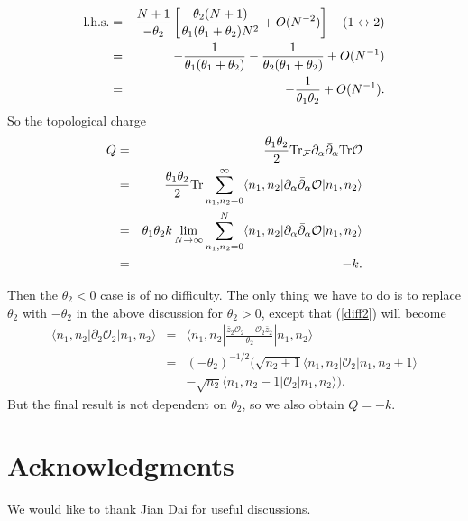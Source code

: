 \documentclass[a4paper,a4paper]{article}
\begin{document}
\begin{eqnarray}
\textrm{l.h.s.} &=&\frac{N+1}{-\theta _{2}}\left[ \frac{\theta _{2}(N+1)}{%
\theta _{1}(\theta _{1}+\theta _{2})N^{2}}+O(N^{-2})\right]
+(1\leftrightarrow 2)  \nonumber \\
&=&-\frac{1}{\theta _{1}(\theta _{1}+\theta _{2})}-\frac{1}{\theta
_{2}(\theta _{1}+\theta _{2})}+O(N^{-1})  \nonumber \\
&=&-\frac{1}{\theta _{1}\theta _{2}}+O(N^{-1}).
\end{eqnarray}%
So the topological charge%
\begin{eqnarray}
Q &=&\frac{\theta _{1}\theta _{2}}{2}\mathrm{Tr}_\mathcal{F}\partial _{\alpha }\bar{%
\partial}_{\alpha }\mathrm{Tr}\mathcal{O}  \nonumber \\
&=&\frac{\theta _{1}\theta _{2}}{2}\mathrm{Tr}\sum_{n_{1},n_{2}=0}^{\infty
}\langle n_{1},n_{2}|\partial _{\alpha }\bar{\partial}_{\alpha }\mathcal{O}%
|n_{1},n_{2}\rangle  \nonumber \\
&=&\theta _{1}\theta _{2}k\lim_{N\rightarrow \infty
}\sum_{n_{1},n_{2}=0}^{N}\langle n_{1},n_{2}|\partial _{\alpha }\bar{\partial%
}_{\alpha }\mathcal{O}|n_{1},n_{2}\rangle  \nonumber \\
&=&-k.
\end{eqnarray}

Then the $\theta _{2}<0$ case is of no difficulty. The only thing
we have to do is to replace $\theta _{2}$ with $-\theta _{2}$ in
the above discussion for $\theta _{2}>0$, except that
(\ref{diff2}) will become
\begin{eqnarray} \langle n_{1},n_{2}|\partial_{2}\mathcal{O}_{2}|n_{1},n_{2}\rangle
&=&\langle n_{1},n_{2}|\frac{\bar{z}_{2}\mathcal{O}_{2}-\mathcal{O}_{2}\bar{z}_{2}}{\theta_{2}}|n_{1},n_{2}\rangle \nonumber\\
&=&(-\theta_2)^{-1/2}(\sqrt{n_2+1}\langle
n_{1},n_{2}|\mathcal{O}_2|n_{1},n_{2}+1\rangle\\
&&-\sqrt{n_2}\langle
n_{1},n_{2}-1|\mathcal{O}_2|n_{1},n_{2}\rangle). \nonumber
\end{eqnarray}
But the final result is not dependent on $\theta _{2}$, so we also
obtain $Q=-k$.

\section*{Acknowledgments}

We would like to thank Jian Dai for useful discussions.

\appendix
\end{document}
